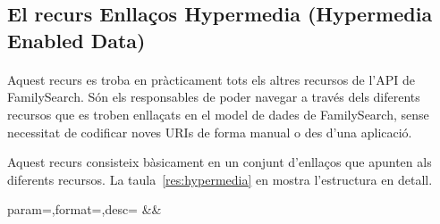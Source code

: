 \subsection{El recurs Enllaços Hypermedia (Hypermedia Enabled Data)}

    \paragraph{}
    Aquest recurs es troba en pràcticament tots els altres recursos de l'API de FamilySearch. Són els responsables de poder navegar a través dels diferents recursos que es troben enllaçats en el model de dades de FamilySearch, sense necessitat de codificar noves URIs de forma manual o des d'una aplicació.

    Aquest recurs consisteix bàsicament en un conjunt d'enllaços que apunten als diferents recursos. La taula~\ref{res:hypermedia} en mostra l'estructura en detall.

    \begin{center}
             {param=\param,format=\format,desc=\desc}
             {\param&\format&\desc}
     \end{center}

